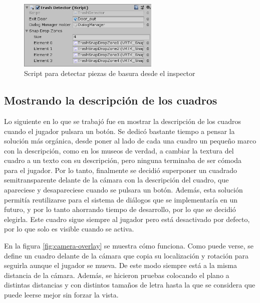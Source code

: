 \begin{figure}[!h]
\begin{center}
\includegraphics[width=0.6\textwidth]{imagenes/7/trash-detector.png}
\caption{Script para detectar piezas de basura desde el inspector}
\label{fig:trash-detector}
\end{center}
\vspace{-0.25cm}
\end{figure}

\subsection{Mostrando la descripción de los cuadros}

Lo siguiente en lo que se trabajó fue en mostrar la descripción de los cuadros cuando el jugador pulsara un botón. Se dedicó bastante tiempo a pensar la solución más orgánica, desde poner al lado de cada una cuadro un pequeño marco con la descripción, como en los museos de verdad, a cambiar la textura del cuadro a un texto con su descripción, pero ninguna terminaba de ser cómoda para el jugador. Por lo tanto, finalmente se decidió superponer un cuadrado semitransparente delante de la cámara con la descripción del cuadro, que apareciese y desapareciese cuando se pulsara un botón. Además, esta solución permitía reutilizarse para el sistema de diálogos que se implementaría en un futuro, y por lo tanto ahorrando tiempo de desarrollo, por lo que se decidió elegirla. Este cuadro sigue siempre al jugador pero está desactivado por defecto, por lo que solo es visible cuando se activa.

En la figura \ref{fig:camera-overlay} se muestra cómo funciona. Como puede verse, se define un cuadro delante de la cámara que copia su localización y rotación para seguirla aunque el jugador se mueva. De este modo siempre está a la misma distancia de la cámara. Además, se hicieron pruebas colocando el plano a distintas distancias y con distintos tamaños de letra hasta la que se considera que puede leerse mejor sin forzar la vista.

